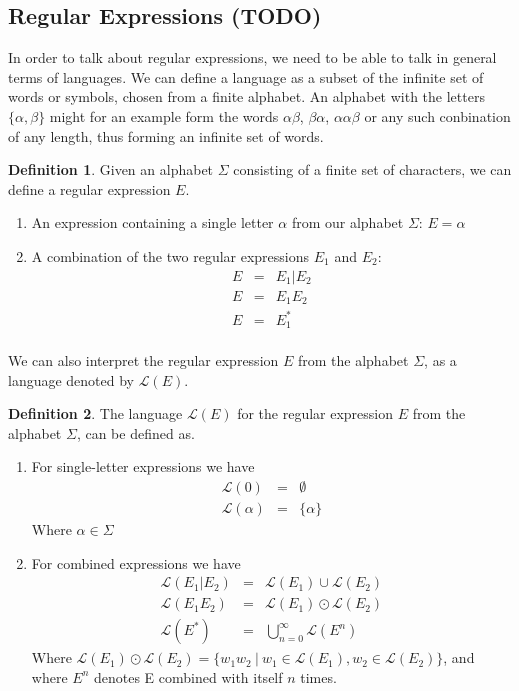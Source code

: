 \documentclass[12pt]{article}
\theoremstyle{definition}
\newtheorem{mydef}{Definition}
\begin{document}
\subsection{Regular Expressions (TODO)}

In order to talk about regular expressions, we need to be able to talk in general terms of languages. We can define a language as a subset of the infinite set of words or symbols, chosen from a finite alphabet. An alphabet with the letters $\{\alpha, \beta\}$ might for an example form the words $\alpha\beta$, $\beta\alpha$, $\alpha\alpha\beta$ or any such conbination of any length, thus forming an infinite set of words.\\

\begin{mydef} Given an alphabet $\Sigma$ consisting of a finite set of characters, we can define a regular expression $E$.
	\begin{enumerate}
		\item An expression containing a single letter $\alpha$ from our alphabet $\Sigma$: $E = \alpha$
		
		\item A combination of the two regular expressions $E_1$ and $E_2$:
		\begin{eqnarray}
			E &=& E_1 | E_2 \\
			E &=& E_1E_2 \\
			E &=& E_1^* \\
		\end{eqnarray}
	\end{enumerate}	
\end{mydef} 

We can also interpret the regular expression $E$ from the alphabet $\Sigma$, as a language denoted by $\mathcal{L}(E)$. \\

\begin{mydef} The language $\mathcal{L}(E)$ for the regular expression $E$ from the alphabet $\Sigma$, can be defined as.

	\begin{enumerate}
		\item For single-letter expressions we have
			\begin{eqnarray}
				\mathcal{L}(0) &=& \emptyset \\
				\mathcal{L}(\alpha) &=& \{\alpha\}
			\end{eqnarray}
			Where $\alpha \in \Sigma$
			
		\item For combined expressions we have
			\begin{eqnarray}
				\mathcal{L}(E_1|E_2) &=& \mathcal{L}(E_1) \cup \mathcal{L}(E_2) \\
				\mathcal{L}(E_1E_2) &=& \mathcal{L}(E_1) \odot \mathcal{L}(E_2) \\
				\mathcal{L}(E^*) &=& \bigcup^{\infty}_{n = 0}\mathcal{L}(E^n)
			\end{eqnarray}
			Where $\mathcal{L}(E_1) \odot \mathcal{L}(E_2) = \{w_1w_2 \ |\  w_1 \in \mathcal{L}(E_1), w_2 \in \mathcal{L}(E_2)\}$, and where $E^n$ denotes E combined with itself $n$ times.
	\end{enumerate}
\end{mydef}
\end{document}
